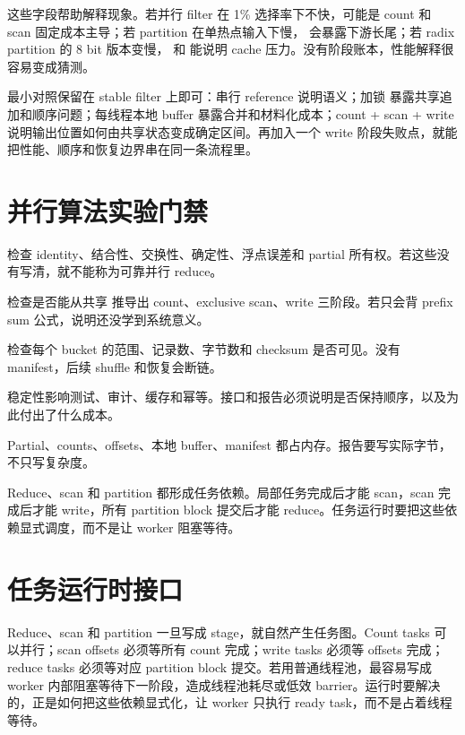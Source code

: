 这些字段帮助解释现象。若并行 filter 在 1\% 选择率下不快，可能是 count 和 scan 固定成本主导；若 partition 在单热点输入下慢， 会暴露下游长尾；若 radix partition 的 8 bit 版本变慢， 和  能说明 cache 压力。没有阶段账本，性能解释很容易变成猜测。

最小对照保留在 stable filter 上即可：串行 reference 说明语义；加锁  暴露共享追加和顺序问题；每线程本地 buffer 暴露合并和材料化成本；count + scan + write 说明输出位置如何由共享状态变成确定区间。再加入一个 write 阶段失败点，就能把性能、顺序和恢复边界串在同一条流程里。

\section{并行算法实验门禁}

检查 identity、结合性、交换性、确定性、浮点误差和 partial 所有权。若这些没有写清，就不能称为可靠并行 reduce。

检查是否能从共享  推导出 count、exclusive scan、write 三阶段。若只会背 prefix sum 公式，说明还没学到系统意义。

检查每个 bucket 的范围、记录数、字节数和 checksum 是否可见。没有 manifest，后续 shuffle 和恢复会断链。

稳定性影响测试、审计、缓存和幂等。接口和报告必须说明是否保持顺序，以及为此付出了什么成本。

Partial、counts、offsets、本地 buffer、manifest 都占内存。报告要写实际字节，不只写复杂度。

Reduce、scan 和 partition 都形成任务依赖。局部任务完成后才能 scan，scan 完成后才能 write，所有 partition block 提交后才能 reduce。任务运行时要把这些依赖显式调度，而不是让 worker 阻塞等待。

\section{任务运行时接口}

Reduce、scan 和 partition 一旦写成 stage，就自然产生任务图。Count tasks 可以并行；scan offsets 必须等所有 count 完成；write tasks 必须等 offsets 完成；reduce tasks 必须等对应 partition block 提交。若用普通线程池，最容易写成 worker 内部阻塞等待下一阶段，造成线程池耗尽或低效 barrier。运行时要解决的，正是如何把这些依赖显式化，让 worker 只执行 ready task，而不是占着线程等待。

